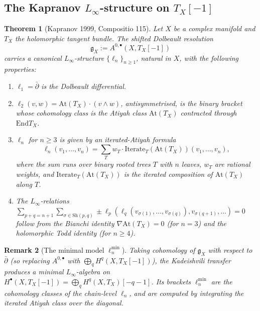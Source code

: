 \documentclass[11pt]{article}
\newtheorem{theorem}{Theorem}[section]
\newtheorem{remark}[theorem]{Remark}
\providecommand{\At}{\mathrm{At}}
\providecommand{\End}{\mathrm{End}}
\begin{document}
\subsection{The Kapranov $L_\infty$-structure on $T_X[-1]$}
\label{subsec:kapranov-linf}

\begin{theorem}[Kapranov 1999, Compositio 115]
\label{thm:kapranov}
Let $X$ be a complex manifold and $T_X$ the holomorphic tangent bundle.
The shifted Dolbeault resolution
\[
  \mathfrak g_X := A^{0, \bullet}(X, T_X[-1])
\]
carries a canonical $L_\infty$-structure $\{\ell_n\}_{n \geq 1}$, natural
in $X$, with the following properties:
\begin{enumerate}
\item $\ell_1 = \bar\partial$ is the Dolbeault differential.
\item $\ell_2(v,w) = \At(T_X) \cdot (v \wedge w)$, antisymmetrised, is
the binary bracket whose cohomology class is the Atiyah class $\At(T_X)$
contracted through $\End T_X$.
\item $\ell_n$ for $n \geq 3$ is given by an iterated-Atiyah formula
\[
  \ell_n(v_1, \ldots, v_n) = \sum_T w_T \cdot \mathrm{Iterate}_T(\At(T_X))(v_1,
    \ldots, v_n),
\]
where the sum runs over binary rooted trees $T$ with $n$ leaves, $w_T$
are rational weights, and $\mathrm{Iterate}_T(\At(T_X))$ is the iterated
composition of $\At(T_X)$ along $T$.
\item The $L_\infty$-relations $\sum_{p+q=n+1} \sum_{\sigma \in
\mathrm{Sh}(p,q)} \pm \ell_p(\ell_q(v_{\sigma(1)}, \ldots,
v_{\sigma(q)}), v_{\sigma(q+1)}, \ldots) = 0$ follow from the Bianchi
identity $\nabla \At(T_X) = 0$ (for $n = 3$) and the holomorphic Todd
identity (for $n \geq 4$).
\end{enumerate}
\end{theorem}

\begin{remark}[The minimal model $\ell_n^{\min}$]
\label{rem:minimal-model}
Taking cohomology of $\mathfrak g_X$ with respect to $\bar\partial$ (so
replacing $A^{0,\bullet}$ with $\bigoplus_q H^q(X, T_X[-1])$), the
Kadeishvili transfer produces a minimal $L_\infty$-algebra on
$H^\bullet(X, T_X[-1]) = \bigoplus_q H^q(X, T_X)[-q-1]$. Its brackets
$\ell_n^{\min}$ are the cohomology classes of the chain-level $\ell_n$,
and are computed by integrating the iterated Atiyah class over the
diagonal.
\end{remark}
\end{document}
